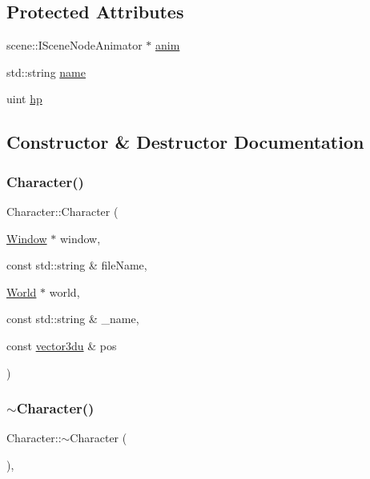 \subsection*{Protected Attributes}
\begin{DoxyCompactItemize}
\item 
scene\+::\+I\+Scene\+Node\+Animator $\ast$ \mbox{\hyperlink{class_character_a21f61734adec2f02e29027c7750d00d0}{anim}}
\item 
std\+::string \mbox{\hyperlink{class_character_a6592c35167738421f3e04ca8808d37db}{name}}
\item 
uint \mbox{\hyperlink{class_character_a1f1db0752324d315af1029a7b08bdea7}{hp}}
\end{DoxyCompactItemize}


\subsection{Constructor \& Destructor Documentation}
\mbox{\label{class_character_a0c05e7e4b128d95737c892adb5cd7a7c}} 
\subsubsection{\texorpdfstring{Character()}{Character()}}
{\footnotesize\ttfamily Character\+::\+Character (\begin{DoxyParamCaption}\item[{\mbox{\hyperlink{class_window}{Window}} $\ast$}]{window,  }\item[{const std\+::string \&}]{file\+Name,  }\item[{\mbox{\hyperlink{class_world}{World}} $\ast$}]{world,  }\item[{const std\+::string \&}]{\+\_\+name,  }\item[{const \mbox{\hyperlink{_utility_8hpp_ac675fa2b6c79d0be47ae76e5d0ce38a8}{vector3du}} \&}]{pos }\end{DoxyParamCaption})}

\mbox{\label{class_character_a9e9be564d05ded80962b2045aa70b3fc}} 
\subsubsection{\texorpdfstring{$\sim$Character()}{~Character()}}
{\footnotesize\ttfamily Character\+::$\sim$\+Character (\begin{DoxyParamCaption}{ }\end{DoxyParamCaption})\hspace{0.3cm}{\ttfamily [virtual]}, {\ttfamily [default]}}



